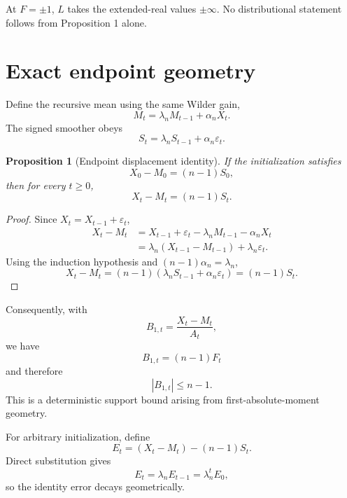 \documentclass[11pt]{article}
\newtheorem{proposition}{Proposition}
\begin{document}
At $F=\pm1$, $L$ takes the extended-real values $\pm\infty$. No distributional statement follows from Proposition 1 alone.

\section{Exact endpoint geometry}
Define the recursive mean using the same Wilder gain,
\begin{equation}
M_t=\lambda_nM_{t-1}+\alpha_nX_t.
\end{equation}
The signed smoother obeys
\begin{equation}
S_t=\lambda_nS_{t-1}+\alpha_n\varepsilon_t.
\end{equation}

\begin{proposition}[Endpoint displacement identity]
If the initialization satisfies
\begin{equation}
X_0-M_0=(n-1)S_0,
\end{equation}
then for every $t\ge0$,
\begin{equation}
\boxed{X_t-M_t=(n-1)S_t.}
\end{equation}
\end{proposition}

\begin{proof}
Since $X_t=X_{t-1}+\varepsilon_t$,
\begin{align*}
X_t-M_t
&=X_{t-1}+\varepsilon_t-\lambda_nM_{t-1}-\alpha_nX_t\\
&=\lambda_n(X_{t-1}-M_{t-1})+\lambda_n\varepsilon_t.
\end{align*}
Using the induction hypothesis and $(n-1)\alpha_n=\lambda_n$,
\[
X_t-M_t=(n-1)(\lambda_nS_{t-1}+\alpha_n\varepsilon_t)=(n-1)S_t.
\]
\end{proof}

Consequently, with
\begin{equation}
B_{1,t}=\frac{X_t-M_t}{A_t},
\end{equation}
we have
\begin{equation}
B_{1,t}=(n-1)F_t
\end{equation}
and therefore
\begin{equation}
\boxed{|B_{1,t}|\le n-1.}
\end{equation}
This is a deterministic support bound arising from first-absolute-moment geometry.

For arbitrary initialization, define
\begin{equation}
E_t=(X_t-M_t)-(n-1)S_t.
\end{equation}
Direct substitution gives
\begin{equation}
E_t=\lambda_nE_{t-1}=\lambda_n^tE_0,
\end{equation}
so the identity error decays geometrically.
\end{document}
